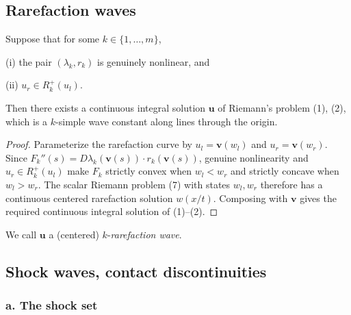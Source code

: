 \subsection{Rarefaction waves}\label{sec:rarefaction-waves}

\begin{theorem}
\label{thm:existence-k-rarefaction-waves}

Suppose that for some $k\in\{1,\ldots,m\}$,

(i) the pair $(\lambda_k, r_k)$ is genuinely nonlinear, and

(ii) $u_r \in R_k^+(u_l)$.

Then there exists a continuous integral solution $\mathbf{u}$ of Riemann's problem (1), (2), which is a $k$-simple wave constant along lines through the origin.
\end{theorem}

\begin{proof}
\sketch Parameterize the rarefaction curve by $u_l=\mathbf v(w_l)$ and $u_r=\mathbf v(w_r)$. Since
$F_k''(s)=D\lambda_k(\mathbf v(s))\cdot r_k(\mathbf v(s))$, genuine nonlinearity and $u_r\in R_k^+(u_l)$ make $F_k$ strictly convex when $w_l<w_r$ and strictly concave when $w_l>w_r$. The scalar Riemann problem (7) with states $w_l,w_r$ therefore has a continuous centered rarefaction solution $w(x/t)$. Composing with $\mathbf v$ gives the required continuous integral solution of (1)--(2).
\end{proof}

\begin{remark}
\label{rem:k-rarefaction-wave-terminology}

We call $\mathbf{u}$ a (centered) $k$-\textit{rarefaction wave}.
\end{remark}

\subsection{Shock waves, contact discontinuities}\label{sec:shock-waves-contact-discontinuities}

\subsubsection*{a. The shock set}

